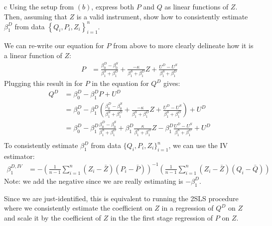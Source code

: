 \documentclass{article}
\begin{document}
\begin{problem}{c}
Using the setup from $(b)$, express both $P$ and $Q$ as linear functions of $Z$. Then, assuming that $Z$ is a valid instrument, show how to consistently estimate $\beta_{1}^{D}$ from data $\left\{Q_{i}, P_{i}, Z_{i}\right\}_{i=1}^{n}$.
\end{problem}
\begin{solution}
We can re-write our equation for $P$ from above to more clearly delineate how it is a linear function of $Z$:
\begin{align*}
    P 
    &= \frac{\beta_{0}^{D} - \beta_{0}^{S}}{\beta_1^S+\beta_1^D} +  \frac{-\kappa}{\beta_1^S+\beta_1^D} Z + \frac{U^D - U^S}{\beta_1^S+\beta_1^D}
\end{align*}
Plugging this result in for $P$ in the equation for $Q^D$ gives:
\begin{align*}
    Q^D &= \beta_{0}^{D}-\beta_{1}^{D} P+U^{D} \\
    &= \beta_{0}^{D}-\beta_{1}^{D} \left(\frac{\beta_{0}^{D} - \beta_{0}^{S}}{\beta_1^S+\beta_1^D} + \frac{-\kappa}{\beta_1^S+\beta_1^D} Z + \frac{U^D - U^S}{\beta_1^S+\beta_1^D} \right) +U^{D} \\
    &= \beta_{0}^{D}-\beta_{1}^{D} \frac{\beta_{0}^{D} - \beta_{0}^{S}}{\beta_1^S+\beta_1^D} 
        + \beta_1^D \frac{\kappa}{\beta_1^S+\beta_1^D} Z 
        - \beta_1^D \frac{U^D - U^S}{\beta_1^S+\beta_1^D} + U^{D} \\
\end{align*}
To consistently estimate $\beta_1^D$ from data $\{Q_i,P_i,Z_i\}_{i=1}^n$, we can use the IV estimator:
\begin{align*}
    \beta_1^{D,IV} &= - \left(\frac{1}{n-1} \sum_{i=1}^{n} (Z_i-\bar{Z}) (P_i-\bar{P}) \right)^{-1}\left(\frac{1}{n-1} \sum_{i=1}^{n} (Z_{i}-\bar{Z})(Q_{i}-\bar{Q}) \right)
\end{align*}
Note: we add the negative since we are really estimating is $-\beta_1^D$.

Since we are just-identified, this is equivalent to running the 2SLS procedure where we consistently estimate the coefficient on $Z$ in a regression of $Q^D$ on $Z$ and scale it by the coefficient of $Z$ in the the first stage regression of $P$ on $Z$.
\end{solution}
\end{document}
